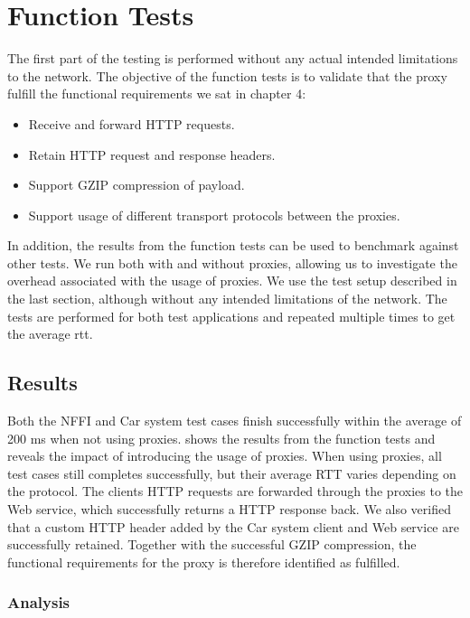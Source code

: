 \section{Function Tests}

The first part of the testing is performed without any actual intended
limitations to the network. The objective of the function tests is to validate
that the proxy fulfill the functional requirements we sat in chapter 4:

\begin{itemize}
    \item Receive and forward HTTP requests.
    \item Retain HTTP request and response headers.
    \item Support GZIP compression of payload.
    \item Support usage of different transport protocols between the proxies.
\end{itemize}

 In addition, the results from the function tests can be used to benchmark
 against other tests. We run both with and without proxies, allowing us to
 investigate the overhead associated with the usage of proxies. We use the test
 setup described in the last section, although without any intended limitations
 of the network. The tests are performed for both test applications and repeated
 multiple times to get the average \gls{rtt}.

\subsection{Results}

Both the NFFI and Car system test cases finish successfully within the average
of 200 ms when not using proxies.  shows
the results from the function tests and reveals the impact of introducing the
usage of proxies. When using proxies, all test cases still completes
successfully, but their average RTT varies depending on the protocol. The
clients HTTP requests are forwarded through the proxies to the Web service,
which successfully returns a HTTP response back. We also verified that a custom
HTTP header added by the Car system client and Web service are successfully
retained. Together with the successful GZIP compression, the functional
requirements for the proxy is therefore identified as fulfilled.

\subsubsection{Analysis}

